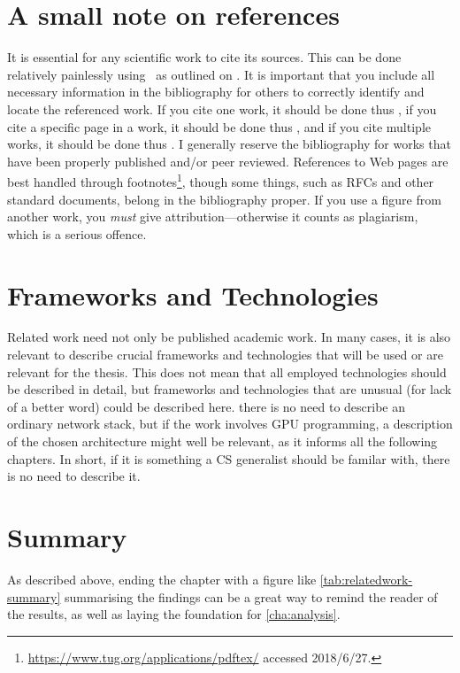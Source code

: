 \section{A small note on references}
\label{sec:small-note-refer}

It is essential for any scientific work to cite its sources. This can be done
relatively painlessly using \mBibTeX\ as outlined on
. It is important that you include all necessary
information in the bibliography for others to correctly identify and locate
the referenced work. If you cite one work, it should be done thus
\cite{Kristensen2010:MP2P2010}, if you cite a specific page in a work, it
should be done thus \cite[p. 410]{Chawathe2003:2003}, and if you cite multiple
works, it should be done thus
\cite{knuth:1976,knuth:1974,Kristensen2010:MP2P2010,Mittelbach2004:TLC2004}.
I generally reserve the bibliography for works that have been properly
published and/or peer reviewed. References to Web pages are best handled
through footnotes\footnote{\url{https://www.tug.org/applications/pdftex/}
  accessed 2018/6/27.}, though some things, such as RFCs and other standard
documents, belong in the bibliography proper. If you use a figure from another
work, you \emph{must} give attribution---otherwise it counts as plagiarism,
which is a serious offence.


\section{Frameworks and Technologies}
\label{sec:fram-techn}

Related work need not only be published academic work. In many cases, it is
also relevant to describe crucial frameworks and technologies that will be
used or are relevant for the thesis.  This does not mean that all employed
technologies should be described in detail, but frameworks and technologies
that are unusual (for lack of a better word) could be described here. \Eg
there is no need to describe an ordinary network stack, but if the work
involves GPU programming, a description of the chosen architecture might well
be relevant, as it informs all the following chapters.  In short, if it is
something a CS generalist should be familar with, there is no need to describe
it.

\section{Summary}
\label{sec:summary}
As described above, ending the chapter with a figure like
\autoref{tab:relatedwork-summary} summarising the findings can be a great way
to remind the reader of the results, as well as laying the foundation for
\autoref{cha:analysis}.


